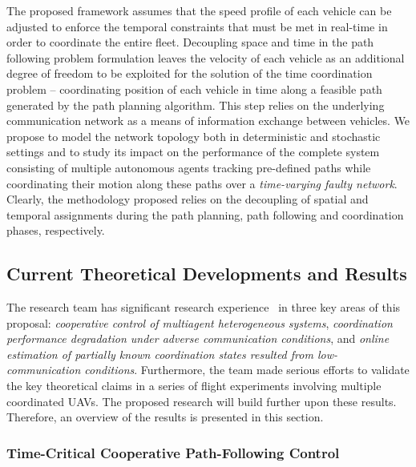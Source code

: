 \documentclass[letter,onecolumn,12pt]{aiaa-tc}
\newcommand{\1}{1_n}
\begin{document}
The proposed framework assumes that the speed profile of each vehicle can be adjusted to enforce the temporal constraints that must be met in real-time in order to coordinate the entire fleet. Decoupling space and time in the path following problem formulation leaves the velocity of each  vehicle as an additional  degree of freedom to be exploited for the solution of the time coordination problem -- coordinating position of each vehicle in time along a feasible path generated by the path planning algorithm.  This step relies on the underlying communication network as a means of information exchange between vehicles. We propose to model the network topology both in deterministic and stochastic settings and to study its impact on the performance of the complete system consisting of multiple autonomous agents tracking pre-defined paths while coordinating their motion along these paths over a \emph{ time-varying faulty network}. Clearly, the methodology proposed relies on the decoupling of spatial and temporal assignments during the path planning, path following and coordination phases, respectively.

\subsection{Current Theoretical Developments and Results}
\label{subsec:current_develop}

The research team has significant research experience~\cite{CSM12_CPF} in three key areas of this proposal: \emph{cooperative control of multiagent heterogeneous systems}, \emph{coordination performance degradation under adverse communication conditions}, and \emph{online estimation of partially known coordination states resulted from low-communication conditions}. Furthermore, the team made serious efforts to validate the key theoretical claims in a series of flight experiments involving multiple coordinated UAVs. The proposed research will build further upon these results. Therefore, an overview of the results is presented in this section.

\subsubsection{Time-Critical Cooperative Path-Following Control}
\label{subsec:time_crit_CPF}
\end{document}
